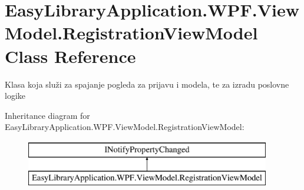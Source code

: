 \hypertarget{class_easy_library_application_1_1_w_p_f_1_1_view_model_1_1_registration_view_model}{}\section{Easy\+Library\+Application.\+W\+P\+F.\+View\+Model.\+Registration\+View\+Model Class Reference}
\label{class_easy_library_application_1_1_w_p_f_1_1_view_model_1_1_registration_view_model}


Klasa koja služi za spajanje pogleda za prijavu i modela, te za izradu poslovne logike  


Inheritance diagram for Easy\+Library\+Application.\+W\+P\+F.\+View\+Model.\+Registration\+View\+Model\+:\begin{figure}[H]
\begin{center}
\leavevmode
\includegraphics[height=2.000000cm]{class_easy_library_application_1_1_w_p_f_1_1_view_model_1_1_registration_view_model}
\end{center}
\end{figure}
